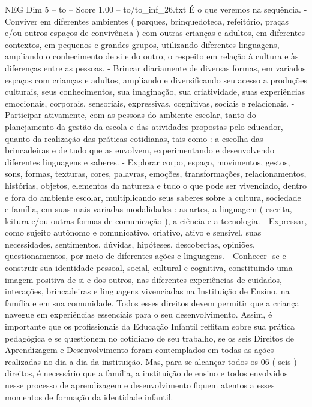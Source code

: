 \begin{textsample}{NEG Dim 5 – to – Score 1.00 – to/to\_inf\_26.txt}
É o que veremos na sequência. - Conviver em diferentes ambientes ( parques, brinquedoteca, refeitório, praças e/ou outros espaços de convivência ) com outras crianças e adultos, em diferentes contextos, em pequenos e grandes grupos, utilizando diferentes linguagens, ampliando o conhecimento de si e do outro, o respeito em relação à cultura e às diferenças entre as pessoas. - Brincar diariamente de diversas formas, em variados espaços com crianças e adultos, ampliando e diversificando seu acesso a produções culturais, seus conhecimentos, sua imaginação, sua criatividade, suas experiências emocionais, corporais, sensoriais, expressivas, cognitivas, sociais e relacionais. - Participar ativamente, com as pessoas do ambiente escolar, tanto do planejamento da gestão da escola e das atividades propostas pelo educador, quanto da realização das práticas cotidianas, tais como : a escolha das brincadeiras e de tudo que as envolvem, experimentando e desenvolvendo diferentes linguagens e saberes. - Explorar corpo, espaço, movimentos, gestos, sons, formas, texturas, cores, palavras, emoções, transformações, relacionamentos, histórias, objetos, elementos da natureza e tudo o que pode ser vivenciado, dentro e fora do ambiente escolar, multiplicando seus saberes sobre a cultura, sociedade e família, em suas mais variadas modalidades : as artes, a linguagem ( escrita, leitura e/ou outras formas de comunicação ), a ciência e a tecnologia. - Expressar, como sujeito autônomo e comunicativo, criativo, ativo e sensível, suas necessidades, sentimentos, dúvidas, hipóteses, descobertas, opiniões, questionamentos, por meio de diferentes ações e linguagens. - Conhecer -se e construir sua identidade pessoal, social, cultural e cognitiva, constituindo uma imagem positiva de si e dos outros, nas diferentes experiências de cuidados, interações, brincadeiras e linguagens vivenciadas na Instituição de Ensino, na família e em sua comunidade.
Todos esses direitos devem permitir que a criança navegue em experiências essenciais para o seu desenvolvimento.
Assim, é importante que os profissionais da Educação Infantil reflitam sobre sua prática pedagógica e se questionem no cotidiano de seu trabalho, se os seis Direitos de Aprendizagem e Desenvolvimento foram contemplados em todas as ações realizadas no dia a dia da instituição.
Mas, para se alcançar todos os 06 ( seis ) direitos, é necessário que a família, a instituição de ensino e todos envolvidos nesse processo de aprendizagem e desenvolvimento fiquem atentos a esses momentos de formação da identidade infantil.

\end{textsample}
